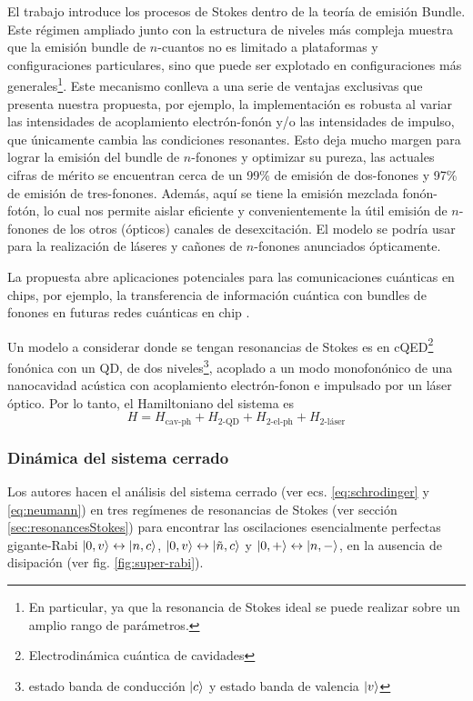 \documentclass[main.tex]{subfiles}
\begin{document}
El trabajo introduce los procesos de Stokes dentro de la teoría de emisión Bundle. Este régimen ampliado junto con la estructura de niveles más compleja muestra que la emisión bundle de $n$-cuantos no es limitado a plataformas y configuraciones particulares, sino que puede ser explotado en configuraciones más generales\footnote{En particular, ya que la resonancia de Stokes ideal se puede realizar sobre un amplio rango de parámetros.}. Este mecanismo conlleva a una serie de ventajas exclusivas que presenta nuestra propuesta, por ejemplo, la implementación es robusta al variar las intensidades de acoplamiento electrón-fonón y/o las intensidades de impulso, que únicamente cambia las condiciones resonantes. Esto deja mucho margen para lograr la emisión del bundle de $n$-fonones y optimizar su pureza, las actuales cifras de mérito \parencite{Stock2011} se encuentran cerca de un 99\% de emisión de dos-fonones y 97\% de emisión de tres-fonones. Además, aquí se tiene la emisión mezclada fonón-fotón, lo cual nos permite aislar eficiente y convenientemente la útil emisión de $n$-fonones de los otros (ópticos) canales de desexcitación. El modelo se podría usar para la realización de láseres y cañones de $n$-fonones anunciados ópticamente.

La propuesta abre aplicaciones potenciales para las comunicaciones cuánticas en chips, por ejemplo, la transferencia de información cuántica con bundles de fonones en futuras redes cuánticas en chip \parencite{Bienfait2019}.

Un modelo a considerar donde se tengan resonancias de Stokes es en cQED\footnote{Electrodinámica cuántica de cavidades} fonónica con un QD, de dos niveles\footnote{estado banda de conducción $\ket{c}$ y estado banda de valencia $\ket{v}$}, acoplado a un modo monofonónico de una nanocavidad acústica con acoplamiento electrón-fonon e impulsado por un láser óptico. Por lo tanto, el Hamiltoniano del sistema es
\begin{equation}
	H = H_\text{cav-ph} + H_\text{2-QD} + H_\text{2-el-ph} + H_\text{2-láser}
\end{equation}

\subsubsection{Dinámica del sistema cerrado}
Los autores hacen el análisis del sistema cerrado (ver ecs. \ref{eq:schrodinger} y \ref{eq:neumann}) en tres regímenes de resonancias de Stokes (ver sección \ref{sec:resonancesStokes}) para encontrar las oscilaciones esencialmente perfectas gigante-Rabi $\ket{0,v} \leftrightarrow \ket{n,c}$, $\ket{0,v} \leftrightarrow \ket{\tilde{n},c}$ y $\ket{0,+} \leftrightarrow \ket{n,-}$, en la ausencia de disipación (ver fig. \ref{fig:super-rabi}).
\end{document}
